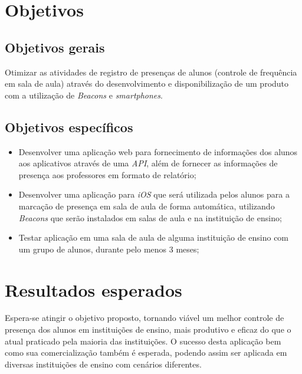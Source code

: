 \documentclass[
	12pt,
	oneside,
	a4paper,
	english,
	brazil,
]{abntex2}
\begin{document}

\chapter{Objetivos}

\section{Objetivos gerais}
Otimizar as atividades de registro de presenças de alunos (controle de frequência em sala de aula) através do desenvolvimento e disponibilização de um produto com a utilização de \emph{Beacons} e \emph{smartphones}.

\section{Objetivos específicos}
\begin{itemize}
  \item Desenvolver uma aplicação web para fornecimento de informações dos alunos aos aplicativos através de uma \emph{API}, além de fornecer as informações de presença aos professores em formato de relatório;
  \item Desenvolver uma aplicação para \emph{iOS} que será utilizada pelos alunos para a marcação de presença em sala de aula de forma automática, utilizando \emph{Beacons} que serão instalados em salas de aula e na instituição de ensino;
  \item Testar aplicação em uma sala de aula de alguma instituição de ensino com um grupo de alunos, durante pelo menos 3 meses;
\end{itemize}


\chapter{Resultados esperados}

Espera-se atingir o objetivo proposto, tornando viável um melhor controle de presença dos alunos em instituições de ensino, mais produtivo e eficaz do que o atual praticado pela maioria das instituições.
O sucesso desta aplicação bem como sua comercialização também é esperada, podendo assim ser aplicada em diversas instituições de ensino com cenários diferentes.
\end{document}
